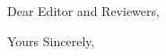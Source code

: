 \documentclass[11pt]{VTletter}
\date{\today}
\begin{document}
%
%
%
\begin{letter}{ 
               }


%
\opening{Dear Editor and Reviewers,}

%

%
%


\vspace{8mm}
\closing{Yours Sincerely,}




\end{letter}


\newpage

% 
% 
\end{document}
